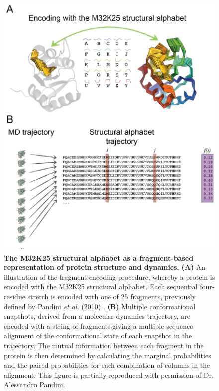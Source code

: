 \begin{figure}[!ht]
\includegraphics[scale=0.6]{structural_alphabet.png}
\caption[The M32K25 structural alphabet as a fragment-based representation of protein structure and dynamics.]{\textbf{The M32K25 structural alphabet as a fragment-based representation of protein structure and dynamics.} \textbf{(A)} An illustration of the fragment-encoding procedure, whereby a protein is encoded with the M32K25 structural alphabet. Each sequential four-residue stretch is encoded with one of 25 fragments, previously defined by Pandini \textit{et al.} (2010) \cite{Pandini:2010aa}. \textbf{(B)} Multiple conformational snapshots, derived from a molecular dynamics trajectory, are encoded with a string of fragments giving a multiple sequence alignment of the conformational state of each snapshot in the trajectory. The mutual information between each fragment in the protein is then determined by calculating the marginal probabilities and the paired probabilities for each combination of columns in the alignment. This figure is partially reproduced with permission of Dr. Alessandro Pandini.}
\label{fig:sa_encoding_analysis}
\end{figure}
